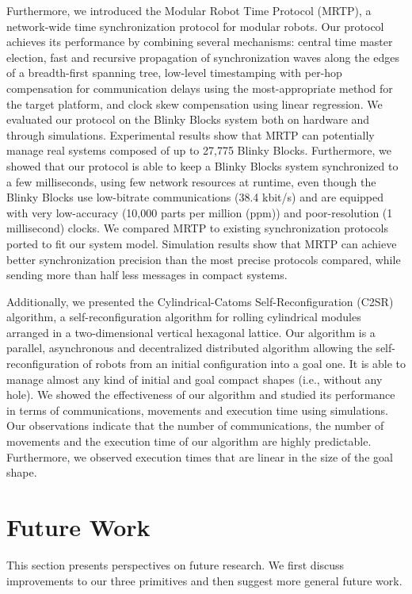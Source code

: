 Furthermore, we introduced the Modular Robot Time Protocol (MRTP), a network-wide time synchronization protocol for modular robots. Our protocol achieves its performance by combining several mechanisms: central time master election, fast and recursive propagation of synchronization waves along the edges of a breadth-first spanning tree, low-level timestamping with per-hop compensation for communication delays using the most-appropriate method for the target platform, and clock skew compensation using linear regression. We evaluated our protocol on the Blinky Blocks system both on hardware and through simulations. Experimental results show that MRTP can potentially manage real systems composed of up to 27,775 Blinky Blocks. Furthermore, we showed that our protocol is able to keep a Blinky Blocks system synchronized to a few milliseconds, using few network resources at runtime, even though the Blinky Blocks use low-bitrate communications (38.4 kbit/s) and are equipped with very low-accuracy (10,000 parts per million (ppm)) and poor-resolution (1 millisecond) clocks. We compared MRTP to existing synchronization protocols ported to fit our system model. Simulation results show that MRTP can achieve better synchronization precision than the most precise protocols compared, while sending more than half less messages in compact systems.

Additionally, we presented the Cylindrical-Catoms Self-Reconfiguration (C2SR) algorithm, a self-reconfiguration algorithm for rolling cylindrical modules arranged in a two-dimensional vertical hexagonal lattice. Our algorithm is a parallel, asynchronous and decentralized distributed algorithm allowing the self-reconfiguration of robots from an initial configuration into a goal one. It is able to manage almost any kind of initial and goal compact shapes (i.e., without any hole). We showed the effectiveness of our algorithm and studied its performance in terms of communications, movements and execution time using simulations. Our observations indicate that the number of communications, the number of movements and the execution time of our algorithm are highly predictable. Furthermore, we observed execution times that are linear in the size of the goal shape.

\section{Future Work}

This section presents perspectives on future research. We first discuss improvements to our three primitives and then suggest more general future work.

